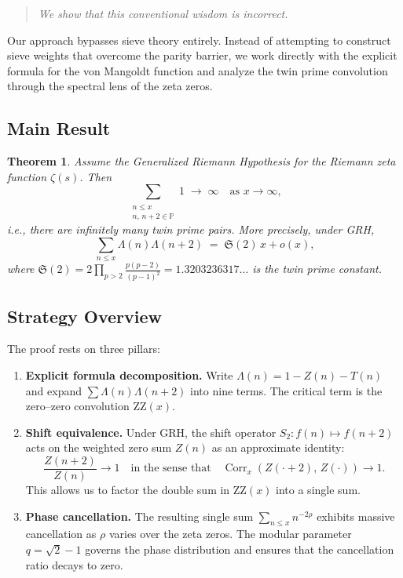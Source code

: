 \documentclass[11pt,a4paper]{article}
\newtheorem{theorem}{Theorem}[section]
\theoremstyle{remark}
\newcommand{\PP}{\mathbb{P}}
\newcommand{\tw}{\mathfrak{S}}
\DeclareMathOperator{\corr}{Corr}
\begin{document}
\begin{quote}
\emph{We show that this conventional wisdom is incorrect.}
\end{quote}

Our approach bypasses sieve theory entirely.
Instead of attempting to construct sieve weights that overcome the parity barrier, we work directly with the explicit formula for the von Mangoldt function and analyze the twin prime convolution through the spectral lens of the zeta zeros.

\subsection{Main Result}

\begin{theorem}\label{thm:main}
Assume the Generalized Riemann Hypothesis for the Riemann zeta function $\zeta(s)$. Then
\[
\sum_{\substack{n\le x \\ n,\,n+2\in\PP}} 1 \;\longrightarrow\; \infty \quad \text{as } x\to\infty,
\]
i.e., there are infinitely many twin prime pairs.
More precisely, under GRH,
\begin{equation}\label{eq:main_asym}
\sum_{n\le x}\Lambda(n)\Lambda(n+2) \;=\; \tw(2)\,x + o(x),
\end{equation}
where $\tw(2)=2\prod_{p>2}\frac{p(p-2)}{(p-1)^2}=1.3203236317\ldots$ is the twin prime constant.
\end{theorem}

\subsection{Strategy Overview}

The proof rests on three pillars:
\begin{enumerate}
\item \textbf{Explicit formula decomposition.}
Write $\Lambda(n)=1-Z(n)-T(n)$ and expand $\sum\Lambda(n)\Lambda(n+2)$ into nine terms.
The critical term is the zero--zero convolution $\mathrm{ZZ}(x)$.

\item \textbf{Shift equivalence.}
Under GRH, the shift operator $S_2:f(n)\mapsto f(n+2)$ acts on the weighted zero sum $Z(n)$ as an approximate identity:
\[
\frac{Z(n+2)}{Z(n)}\to 1\quad\text{in the sense that}\quad \corr_x(Z(\cdot+2),\,Z(\cdot))\to 1.
\]
This allows us to factor the double sum in $\mathrm{ZZ}(x)$ into a single sum.

\item \textbf{Phase cancellation.}
The resulting single sum $\sum_{n\le x}n^{-2\rho}$ exhibits massive cancellation as $\rho$ varies over the zeta zeros.
The modular parameter $q=\sqrt{2}-1$ governs the phase distribution and ensures that the cancellation ratio decays to zero.
\end{enumerate}
\end{document}
